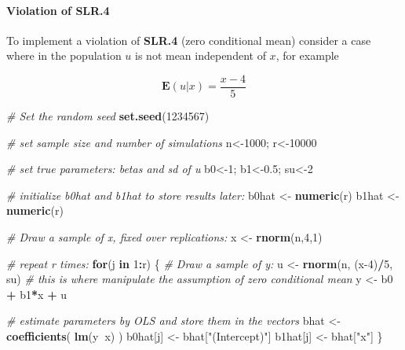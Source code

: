 \documentclass[]{book}
\newenvironment{Shaded}{\begin{snugshade}}{\end{snugshade}}
\newcommand{\CommentTok}[1]{\textcolor[rgb]{0.56,0.35,0.01}{\textit{#1}}}
\newcommand{\ControlFlowTok}[1]{\textcolor[rgb]{0.13,0.29,0.53}{\textbf{#1}}}
\newcommand{\DecValTok}[1]{\textcolor[rgb]{0.00,0.00,0.81}{#1}}
\newcommand{\FloatTok}[1]{\textcolor[rgb]{0.00,0.00,0.81}{#1}}
\newcommand{\KeywordTok}[1]{\textcolor[rgb]{0.13,0.29,0.53}{\textbf{#1}}}
\newcommand{\NormalTok}[1]{#1}
\newcommand{\OperatorTok}[1]{\textcolor[rgb]{0.81,0.36,0.00}{\textbf{#1}}}
\newcommand{\StringTok}[1]{\textcolor[rgb]{0.31,0.60,0.02}{#1}}
\let\oldparagraph\paragraph
\renewcommand{\paragraph}[1]{\oldparagraph{#1}\mbox{}}
\begin{document}
\hypertarget{violation-of-slr.4}{%
\paragraph{Violation of SLR.4}\label{violation-of-slr.4}}

To implement a violation of \textbf{SLR.4} (zero conditional mean)
consider a case where in the population \(u\) is not mean independent of
\(x\), for example

\[
\mathbf{E}(u|x) = \frac{x-4}{5}
\]

\begin{Shaded}
\begin{Highlighting}[]
\CommentTok{# Set the random seed}
\KeywordTok{set.seed}\NormalTok{(}\DecValTok{1234567}\NormalTok{)}

\CommentTok{# set sample size and number of simulations}
\NormalTok{n<-}\DecValTok{1000}\NormalTok{; r<-}\DecValTok{10000}

\CommentTok{# set true parameters: betas and sd of u}
\NormalTok{b0<-}\DecValTok{1}\NormalTok{; b1<-}\FloatTok{0.5}\NormalTok{; su<-}\DecValTok{2}

\CommentTok{# initialize b0hat and b1hat to store results later:}
\NormalTok{b0hat <-}\StringTok{ }\KeywordTok{numeric}\NormalTok{(r)}
\NormalTok{b1hat <-}\StringTok{ }\KeywordTok{numeric}\NormalTok{(r)}

\CommentTok{# Draw a sample of x, fixed over replications:}
\NormalTok{x <-}\StringTok{ }\KeywordTok{rnorm}\NormalTok{(n,}\DecValTok{4}\NormalTok{,}\DecValTok{1}\NormalTok{)}

\CommentTok{# repeat r times:}
\ControlFlowTok{for}\NormalTok{(j }\ControlFlowTok{in} \DecValTok{1}\OperatorTok{:}\NormalTok{r) \{}
  \CommentTok{# Draw a sample of y:}
\NormalTok{  u <-}\StringTok{ }\KeywordTok{rnorm}\NormalTok{(n, (x}\DecValTok{-4}\NormalTok{)}\OperatorTok{/}\DecValTok{5}\NormalTok{, su) }\CommentTok{# this is where manipulate the assumption of zero conditional mean}
\NormalTok{  y <-}\StringTok{ }\NormalTok{b0 }\OperatorTok{+}\StringTok{ }\NormalTok{b1}\OperatorTok{*}\NormalTok{x }\OperatorTok{+}\StringTok{ }\NormalTok{u}
  
  \CommentTok{# estimate parameters by OLS and store them in the vectors}
\NormalTok{  bhat <-}\StringTok{ }\KeywordTok{coefficients}\NormalTok{( }\KeywordTok{lm}\NormalTok{(y}\OperatorTok{~}\NormalTok{x) )}
\NormalTok{  b0hat[j] <-}\StringTok{ }\NormalTok{bhat[}\StringTok{"(Intercept)"}\NormalTok{]}
\NormalTok{  b1hat[j] <-}\StringTok{ }\NormalTok{bhat[}\StringTok{"x"}\NormalTok{]}
\NormalTok{\}}
\end{Highlighting}
\end{Shaded}
\end{document}
